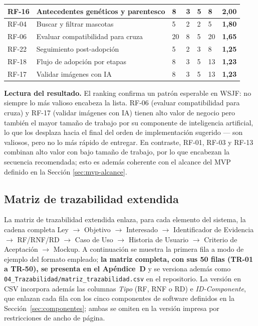 \documentclass[journal,onecolumn]{IEEEtran}
\begin{document}
\begin{longtable}{@{}p{1.4cm} p{5.4cm} p{1.5cm} p{1.5cm} p{1.5cm} p{1.5cm} p{1.3cm}@{}}
		\hline
		RF-16 & Antecedentes genéticos y parentesco & 8 & 3 & 5 & 8 & \textbf{2,00} \\
		\hline
		RF-04 & Buscar y filtrar mascotas & 5 & 2 & 2 & 5 & \textbf{1,80} \\
		\hline
		RF-06 & Evaluar compatibilidad para cruza & 20 & 8 & 5 & 20 & \textbf{1,65} \\
		\hline
		RF-22 & Seguimiento post-adopción & 5 & 2 & 3 & 8 & \textbf{1,25} \\
		\hline
		RF-18 & Flujo de adopción por etapas & 8 & 3 & 5 & 13 & \textbf{1,23} \\
		\hline
		RF-17 & Validar imágenes con IA & 8 & 3 & 5 & 13 & \textbf{1,23} \\
	\end{longtable}
	
	\textbf{Lectura del resultado.} El ranking confirma un patrón esperable en
	WSJF: no siempre lo más valioso encabeza la lista. RF-06 (evaluar
	compatibilidad para cruza) y RF-17 (validar imágenes con IA) tienen alto
	valor de negocio pero también el mayor tamaño de trabajo por su componente
	de inteligencia artificial, lo que los desplaza hacia el final del orden de
	implementación sugerido --- son valiosos, pero no lo más rápido de
	entregar. En contraste, RF-01, RF-03 y RF-13 combinan alto valor con bajo
	tamaño de trabajo, por lo que encabezan la secuencia recomendada; esto es
	además coherente con el alcance del MVP definido en la Sección
	\ref{sec:mvp-alcance}.
	
	\subsection{Matriz de trazabilidad extendida}
	\label{sec:trazabilidad}
	
	La matriz de trazabilidad extendida enlaza, para cada elemento del sistema,
	la cadena completa Ley $\rightarrow$ Objetivo $\rightarrow$ Interesado
	$\rightarrow$ Identificador de Evidencia $\rightarrow$ RF/RNF/RD
	$\rightarrow$ Caso de Uso $\rightarrow$ Historia de Usuario
	$\rightarrow$ Criterio de Aceptación $\rightarrow$ Mockup. A continuación se
	muestra la primera fila a modo de ejemplo del formato empleado;
	\textbf{la matriz completa, con sus 50 filas (TR-01 a TR-50), se presenta en
		el Apéndice~D} y se versiona además como
	\texttt{04\_Trazabilidad/matriz\_trazabilidad.csv} en el repositorio. La
	versión en CSV incorpora además las columnas \emph{Tipo} (RF, RNF o RD) e
	\emph{ID-Componente}, que enlazan cada fila con los cinco componentes de
	software definidos en la Sección~\ref{sec:componentes}; ambas se omiten en la
	versión impresa por restricciones de ancho de página.
	
\end{document}
